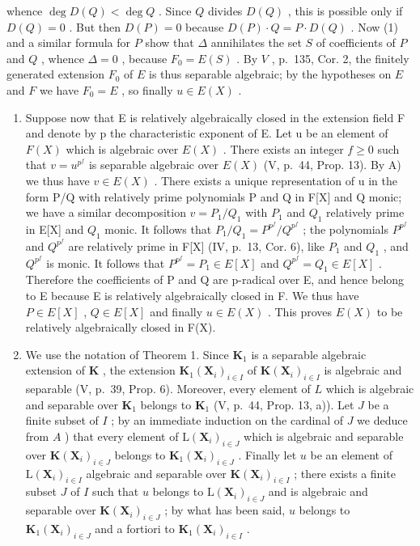 whence \(\deg D(Q) < \deg Q\) . Since \(Q\) divides \(D(Q)\) , this is possible only if \(D(Q) = 0\) . But then \(D(P) = 0\) because \(D(P) \cdot Q = P \cdot D(Q)\) . Now (1) and a similar formula for \(P\) show that \(\Delta\) annihilates the set \(S\) of coefficients of \(P\) and \(Q\) , whence \(\Delta = 0\) , because \(F_0 = E(S)\) . By \(V\) , p.~135, Cor. 2, the finitely generated extension \(F_0\) of \(E\) is thus separable algebraic; by the hypotheses on \(E\) and \(F\) we have \(F_0 = E\) , so finally \(u \in E(X)\) .

\begin{enumerate}
\def\labelenumi{\Alph{enumi})}
\setcounter{enumi}{1}
\item
  Suppose now that E is relatively algebraically closed in the extension field F and denote by p the characteristic exponent of E. Let u be an element of \(F(X)\) which is algebraic over \(E(X)\) . There exists an integer \(f \geqslant 0\) such that \(v = u^{p^f}\) is separable algebraic over \(E(X)\) (V, p.~44, Prop. 13). By A) we thus have \(v \in E(X)\) . There exists a unique representation of u in the form P/Q with relatively prime polynomials P and Q in F{[}X{]} and Q monic; we have a similar decomposition \(v = P_1 / Q_1\) with \(P_1\) and \(Q_1\) relatively prime in E{[}X{]} and \(Q_1\) monic. It follows that \(P_1 / Q_1 = P^{p^f} / Q^{p^f}\) ; the polynomials \(P^{p^f}\) and \(Q^{p^f}\) are relatively prime in F{[}X{]} (IV, p.~13, Cor. 6), like \(P_1\) and \(Q_1\) , and \(Q^{p^f}\) is monic. It follows that \(P^{p^f} = P_1 \in E[X]\) and \(Q^{p^f} = Q_1 \in E[X]\) . Therefore the coefficients of P and Q are p-radical over E, and hence belong to E because E is relatively algebraically closed in F. We thus have \(P \in E[X]\) , \(Q \in E[X]\) and finally \(u \in E(X)\) . This proves \(E(X)\) to be relatively algebraically closed in F(X).
\item
  We use the notation of Theorem 1. Since \(\mathbf{K}_1\) is a separable algebraic extension of \(\mathbf{K}\) , the extension \(\mathbf{K}_1(\mathbf{X}_i)_{i\in I}\) of \(\mathbf{K}(\mathbf{X}_i)_{i\in I}\) is algebraic and separable (V, p.~39, Prop. 6). Moreover, every element of \(L\) which is algebraic and separable over \(\mathbf{K}_1\) belongs to \(\mathbf{K}_1\) (V, p.~44, Prop. 13, a)). Let \(J\) be a finite subset of \(I\) ; by an immediate induction on the cardinal of \(J\) we deduce from \(A\) ) that every element of \(\mathrm{L}(\mathbf{X}_i)_{i\in J}\) which is algebraic and separable over \(\mathbf{K}(\mathbf{X}_i)_{i\in J}\) belongs to \(\mathbf{K}_1(\mathbf{X}_i)_{i\in J}\) . Finally let \(u\) be an element of \(\mathrm{L}(\mathbf{X}_i)_{i\in I}\) algebraic and separable over \(\mathbf{K}(\mathbf{X}_i)_{i\in I}\) ; there exists a finite subset \(J\) of \(I\) such that \(u\) belongs to \(\mathrm{L}(\mathbf{X}_i)_{i\in J}\) and is algebraic and separable over \(\mathbf{K}(\mathbf{X}_i)_{i\in J}\) ; by what has been said, \(u\) belongs to \(\mathbf{K}_1(\mathbf{X}_i)_{i\in J}\) and a fortiori to \(\mathbf{K}_1(\mathbf{X}_i)_{i\in I}\) .
\end{enumerate}

